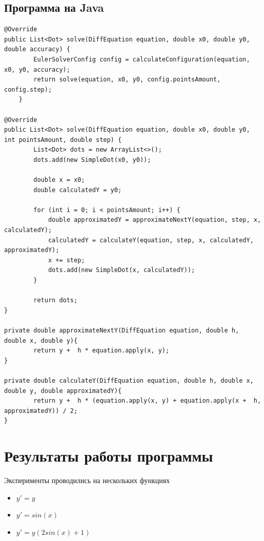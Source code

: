 \documentclass[11pt, english]{article}
\begin{document}
\subsection{Программа на Java}
\begin{lstlisting}
@Override
public List<Dot> solve(DiffEquation equation, double x0, double y0, double accuracy) {
        EulerSolverConfig config = calculateConfiguration(equation, x0, y0, accuracy);
        return solve(equation, x0, y0, config.pointsAmount, config.step);
    }

@Override
public List<Dot> solve(DiffEquation equation, double x0, double y0, int pointsAmount, double step) {
        List<Dot> dots = new ArrayList<>();
        dots.add(new SimpleDot(x0, y0));

        double x = x0;
        double calculatedY = y0;

        for (int i = 0; i < pointsAmount; i++) {
            double approximatedY = approximateNextY(equation, step, x, calculatedY);
            calculatedY = calculateY(equation, step, x, calculatedY, approximatedY);
            x += step;
            dots.add(new SimpleDot(x, calculatedY));
        }

        return dots;
}

private double approximateNextY(DiffEquation equation, double h, double x, double y){
        return y +  h * equation.apply(x, y);
}

private double calculateY(DiffEquation equation, double h, double x, double y, double approximatedY){
        return y +  h * (equation.apply(x, y) + equation.apply(x +  h, approximatedY)) / 2;
}

\end{lstlisting}
\newpage
\section{Результаты работы программы}
Эксперименты проводились на нескольких функциях
\begin{itemize}
    \item $y' = y$
    \item $y' = sin(x)$
    \item $y' = y( 2sin(x) + 1)$
\end{itemize}
\end{document}
